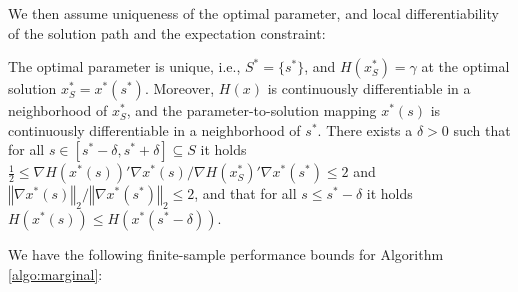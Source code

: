\documentclass[mnsc,blindrev]{informs4} %
\newcommand{\norm}[1]{\left \Vert #1 \right\Vert}
\begin{document}
 We then assume uniqueness of the optimal parameter, and local differentiability of the solution path and the expectation constraint:
 \begin{assumption}\label{unique optimal parameter + local differentiability}
 The optimal parameter is unique, i.e., $S^*=\{s^*\}$, and $H(x_S^*)=\gamma$ at the optimal solution $x_S^*=x^*(s^*)$. Moreover, $H(x)$ is continuously differentiable in a neighborhood of $x_S^*$, and the parameter-to-solution mapping $x^*(s)$ is continuously differentiable in a neighborhood of $s^*$. There exists a $\delta>0$ such that for all $s\in[s^*-\delta,s^*+\delta]\subseteq S$ it holds $\frac{1}{2}\leq \nabla H(x^*(s))'\nabla x^*(s)/\nabla H(x^*_S)'\nabla x^*(s^*)\leq 2$ and $\norm{\nabla x^*(s)}_2/\norm{\nabla x^*(s^*)}_2\leq 2$, and that for all $s\leq s^*-\delta$ it holds $H(x^*(s))\leq H(x^*(s^*-\delta))$.
 \end{assumption}
We have the following finite-sample performance bounds for Algorithm \ref{algo:marginal}:
\end{document}

